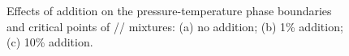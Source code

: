 

\begin{figure}[htb]
    \centering


    \caption{Effects of  addition on the pressure-temperature phase boundaries and critical points of // mixtures: (a) no  addition; (b) 1\%  addition; (c) 10\%  addition.}
    \label{v5}
\end{figure}

